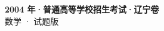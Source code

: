 \documentclass[zihao=-4, a4paper]{ctexart}
\begin{document}
\begin{center}
  {\Large\bfseries 2004 年·普通高等学校招生考试·辽宁卷}\\[4pt]
  {\large 数学 · 试题版}
\end{center}
\medskip
{}

\end{document}
